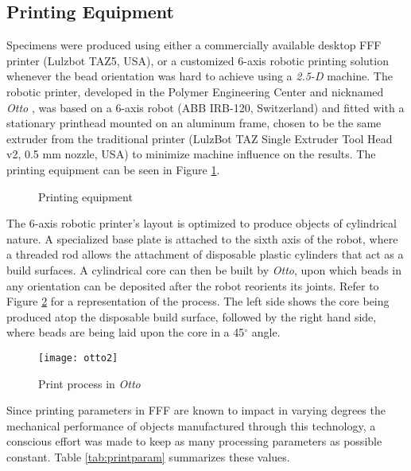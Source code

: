 \documentclass[main.tex]{subfiles}
\begin{document}
\subsection{Printing Equipment}
Specimens were produced using either a commercially available desktop FFF printer (Lulzbot TAZ5, USA), or a customized 6-axis robotic printing solution whenever the bead orientation was hard to achieve using a \emph{2.5-D} machine. The robotic printer, developed in the Polymer Engineering Center and nicknamed \emph{Otto} \cite{VanHulle2017}, was based on a 6-axis robot (ABB IRB-120, Switzerland) and fitted with a stationary printhead mounted on an aluminum frame, chosen to be the same extruder from the traditional printer (LulzBot TAZ Single Extruder Tool Head v2, 0.5 mm nozzle, USA) to minimize machine influence on the results. The printing equipment can be seen in Figure \ref{fig:PrintEquip}. 
\begin{figure}[h]
	\center
	\hfill
	\caption{Printing equipment} \label{fig:PrintEquip}
\end{figure}

The 6-axis robotic printer's layout is optimized to produce objects of cylindrical nature. A specialized base plate is attached to the sixth axis of the robot, where a threaded rod allows the attachment of disposable plastic cylinders that act as a build surfaces. A cylindrical core can then be built by \emph{Otto}, upon which beads in any orientation can be deposited after the robot reorients its joints. Refer to Figure \ref{fig:otto2} for a representation of the process. The left side shows the core being produced atop the disposable build surface, followed by the right hand side, where beads are being laid upon the core in a 45$^\circ$ angle.  
\begin{figure}[h]
	\center
	\texttt{[image: otto2]}
	\caption{Print process in \emph{Otto}} \label{fig:otto2}
\end{figure}

Since printing parameters in FFF are known to impact in varying degrees the mechanical performance of objects manufactured through this technology, a conscious effort was made to keep as many processing parameters as possible constant. Table \ref{tab:printparam} summarizes these values.
\end{document}
